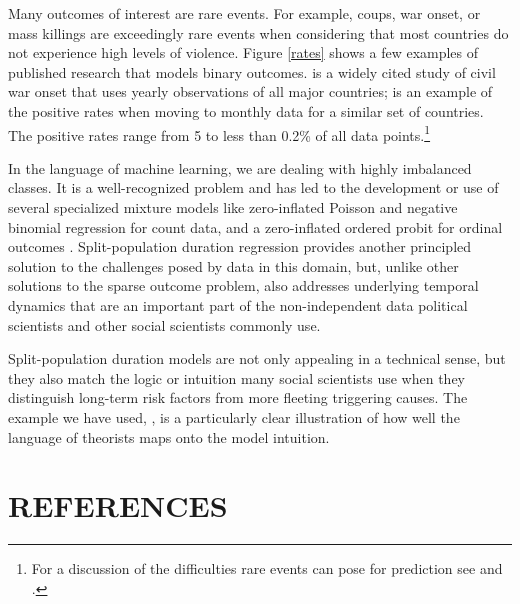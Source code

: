 \documentclass[12pt,onesided]{amsart}
\begin{document}
Many outcomes of interest are rare events. For example, coups, war
onset, or mass killings are exceedingly rare events when considering
that most countries do not experience high levels of violence. Figure
\ref{rates} shows a few examples of published research that models
binary outcomes. \citet{fearon2003ethnicity} is a widely cited study of
civil war onset that uses yearly observations of all major countries;
\citet{beger2014ensemble} is an example of the positive rates when
moving to monthly data for a similar set of countries. The positive
rates range from 5 to less than 0.2\% of all data points.\footnote{For a
  discussion of the difficulties rare events can pose for prediction see
  \citet{king2001explaining} and \citet{king2001logistic}.}

In the language of machine learning, we are dealing with highly
imbalanced classes. It is a well-recognized problem and has led to the
development or use of several specialized mixture models like
zero-inflated Poisson and negative binomial regression for count data,
and a zero-inflated ordered probit for ordinal outcomes \citep{bagozzi2015modeling}. Split-population duration regression provides another principled
solution to the challenges posed by data in this domain, but, unlike
other solutions to the sparse outcome problem, also addresses underlying
temporal dynamics that are an important part of the non-independent data
political scientists and other social scientists commonly use.

Split-population duration models are not only appealing in a technical
sense, but they also match the logic or intuition many social scientists
use when they distinguish long-term risk factors from more fleeting
triggering causes. The example we have used, \citet{belkin2003toward},
is a particularly clear illustration of how well the language of
theorists maps onto the model intuition.

\section{REFERENCES}
%


\end{document}
